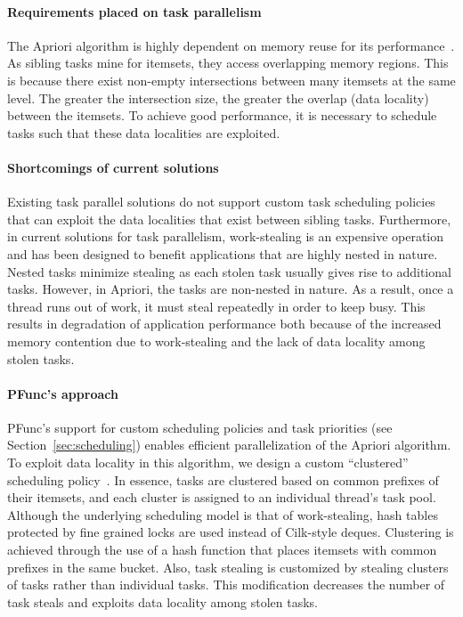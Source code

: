 \documentclass{sig-alternate}
\begin{document}
\paragraph{Requirements placed on task parallelism}
The Apriori algorithm is highly dependent on memory reuse for its
performance~\cite{Ghoting:2007}. As sibling tasks mine for itemsets, they
access overlapping memory regions.  This is because there exist non-empty
intersections between many itemsets at the same level. The greater the
intersection size, the greater the overlap (data locality) between the
itemsets. To achieve good performance, it is necessary to schedule tasks such
that these data localities are exploited.

\paragraph{Shortcomings of current solutions}
Existing task parallel solutions do not support custom task scheduling policies
that can exploit the data localities that exist between sibling tasks.
Furthermore, in current solutions for task parallelism, work-stealing is an
expensive operation and has been designed to benefit applications that are
highly nested in nature.  Nested tasks minimize stealing as each stolen task
usually gives rise to additional tasks. However, in Apriori, the tasks are
non-nested in nature. As a result, once a thread runs out of work, it must
steal repeatedly in order to keep busy.  This results in degradation of
application performance both because of the increased memory contention due to
work-stealing and the lack of data locality among stolen tasks.

\paragraph{PFunc's approach}
PFunc's support for custom scheduling policies and task priorities (see
Section~\ref{sec:scheduling}) enables efficient parallelization of the Apriori
algorithm.  To exploit data locality in this algorithm, we design a custom
``clustered'' scheduling policy~\cite{Zaki:1997}.  In essence, tasks are
clustered based on common prefixes of their itemsets, and each cluster
is assigned to an individual thread's task pool. Although the underlying
scheduling model is that of work-stealing, hash tables protected by fine
grained locks are used instead of Cilk-style deques.  Clustering is achieved
through the use of a hash function that places itemsets with common prefixes in
the same bucket.  Also, task stealing is customized by stealing clusters of
tasks rather than individual tasks. This modification decreases the number of
task steals and exploits data locality among stolen tasks.
\end{document}
